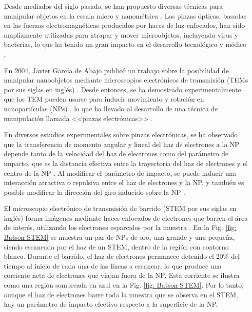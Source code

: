\label{cap: introduccion}

Desde mediados del siglo pasado, se han propuesto diversas técnicas para manipular objetos en la escala micro y nanométrica \cite{ashkin1970acceleration, ashkin1987optical, Ashkin, custance2009atomic, dholakia2011shaping, marago2013optical, romo2020controlled}. Las pinzas ópticas, basadas en las fuerzas electromagnéticas producidos por haces de luz enfocados, han sido ampliamente utilizadas para atrapar y mover microobjetos, incluyendo virus y bacterias, lo que ha tenido un gran impacto en el desarrollo tecnológico y médico \cite{ashkin1970acceleration, ashkin1987optical, Ashkin}.  

En 2004, Javier García de Abajo publicó un trabajo sobre la posibilidad de manipular nanoobjetos mediante microscopios electrónicos de transmisión (TEMs por sus siglas en inglés) \cite{GarciadeAbajo0}. Desde entonces, se ha demostrado experimentalmente que los TEM pueden usarse para inducir movimiento y rotación en nanopartículas (NPs) \cite{Batson01, zheng2012electron}, lo que ha llevado al desarrollo de una técnica de manipulación llamada <<pinzas electrónicas>> \cite{Batson, oleshko2005electron, Oleshko}.

En diversos estudios experimentales sobre pinzas electrónicas, se ha observado que la transferencia de momento angular y lineal del haz de electrones a la NP depende tanto de la velocidad del haz de electrones como del parámetro de impacto, que es la distancia efectiva entre la trayectoria del haz de electrones y el centro de la NP \cite{OLESHKO2013203, Oleshko, Batson, Batson01, zheng2012electron, xu2010transmission}.  Al modificar el parámetro de impacto, se puede inducir una interacción atractiva o repulsiva entre el haz de electrones y la NP, y también es posible modificar la dirección del giro inducido sobre la NP \cite{OLESHKO2013203, Batson, Oleshko}. 

El microscopio electrónico de transmisión de barrido (STEM por sus siglas en inglés) forma imágenes mediante haces enfocados de electrones que barren el área de interés, utilizando los electrones esparcidos por la muestra \cite{Batson}. En la Fig. \ref{fig: Batson STEM} se muestra un par de NPs de oro, una grande y una pequeña, siendo escaneada por el haz de un STEM, dentro de la región con contorno blanco. Durante el barrido, el haz de electrones permanece detenido el 20\% del tiempo al inicio de cada una de las líneas a escanear, lo que produce una corriente neta de electrones que viajan fuera de la NP. Esta corriente se ilustra como una región sombreada en azul en la Fig. \ref{fig: Batson STEM}. Por lo tanto, aunque el haz de electrones barre toda la muestra que se observa en el STEM, hay un parámetro de impacto efectivo respecto a la superficie de la NP.

